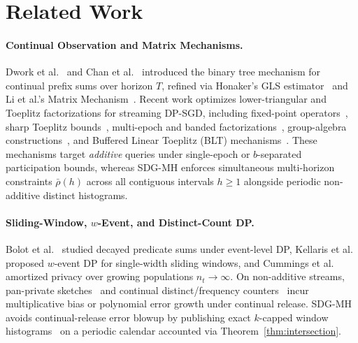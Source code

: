 \documentclass[sigconf, nonacm]{acmart}
\begin{document}
\section{Related Work}
\label{sec:related}

\paragraph{Continual Observation and Matrix Mechanisms.}
Dwork et al.~\cite{dwork2010continual} and Chan et al.~\cite{chan2011private} introduced the binary tree mechanism for continual prefix sums over horizon $T$, refined via Honaker's GLS estimator~\cite{honaker2015efficient} and Li et al.'s Matrix Mechanism~\cite{li2015matrix}. Recent work optimizes lower-triangular and Toeplitz factorizations for streaming DP-SGD, including fixed-point operators~\cite{denisov2022improved}, sharp Toeplitz bounds~\cite{fichtenberger2023constant}, multi-epoch and banded factorizations~\cite{choquette2023multiepoch,choquette2023banded}, group-algebra constructions~\cite{henzinger2024group}, and Buffered Linear Toeplitz (BLT) mechanisms~\cite{mcmahan2025blt}. These mechanisms target \emph{additive} queries under single-epoch or $b$-separated participation bounds, whereas SDG-MH enforces simultaneous multi-horizon constraints $\bar{\rho}(h)$ across all contiguous intervals $h \ge 1$ alongside periodic non-additive distinct histograms.

\paragraph{Sliding-Window, $w$-Event, and Distinct-Count DP\@.}
Bolot et al.~\cite{bolot2013decayed} studied decayed predicate sums under event-level DP, Kellaris et al.~\cite{kellaris2014wevent} proposed $w$-event DP for single-width sliding windows, and Cummings et al.~\cite{cummings2018growing} amortized privacy over growing populations $n_t \to \infty$. On non-additive streams, pan-private sketches~\cite{mir2011panprivate} and continual distinct/frequency counters~\cite{epasto2023frequency,ghazi2023distinct,jain2023turnstile} incur multiplicative bias or polynomial error growth under continual release. SDG-MH avoids continual-release error blowup by publishing exact $k$-capped window histograms~\cite{amin2019bounding} on a periodic calendar accounted via Theorem~\ref{thm:intersection}.
\end{document}
